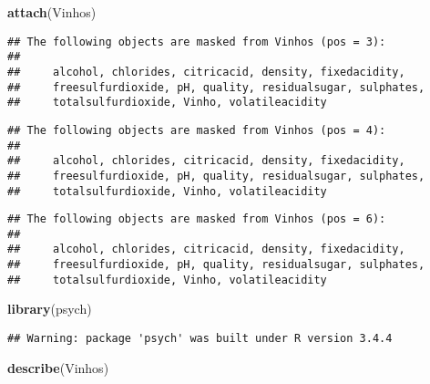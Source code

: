 \documentclass[]{article}
\newenvironment{Shaded}{\begin{snugshade}}{\end{snugshade}}
\newcommand{\KeywordTok}[1]{\textcolor[rgb]{0.13,0.29,0.53}{\textbf{#1}}}
\newcommand{\NormalTok}[1]{#1}
\begin{document}
\begin{Shaded}
\begin{Highlighting}[]
\KeywordTok{attach}\NormalTok{(Vinhos)}
\end{Highlighting}
\end{Shaded}

\begin{verbatim}
## The following objects are masked from Vinhos (pos = 3):
## 
##     alcohol, chlorides, citricacid, density, fixedacidity,
##     freesulfurdioxide, pH, quality, residualsugar, sulphates,
##     totalsulfurdioxide, Vinho, volatileacidity
\end{verbatim}

\begin{verbatim}
## The following objects are masked from Vinhos (pos = 4):
## 
##     alcohol, chlorides, citricacid, density, fixedacidity,
##     freesulfurdioxide, pH, quality, residualsugar, sulphates,
##     totalsulfurdioxide, Vinho, volatileacidity
\end{verbatim}

\begin{verbatim}
## The following objects are masked from Vinhos (pos = 6):
## 
##     alcohol, chlorides, citricacid, density, fixedacidity,
##     freesulfurdioxide, pH, quality, residualsugar, sulphates,
##     totalsulfurdioxide, Vinho, volatileacidity
\end{verbatim}

\begin{Shaded}
\begin{Highlighting}[]
\KeywordTok{library}\NormalTok{(psych)}
\end{Highlighting}
\end{Shaded}

\begin{verbatim}
## Warning: package 'psych' was built under R version 3.4.4
\end{verbatim}

\begin{Shaded}
\begin{Highlighting}[]
\KeywordTok{describe}\NormalTok{(Vinhos)}
\end{Highlighting}
\end{Shaded}
\end{document}
